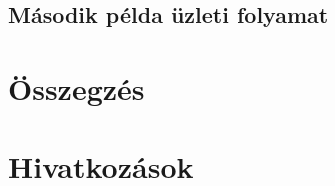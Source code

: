 \documentclass[12pt,a4paper]{book}
\begin{document}

\section{Második példa üzleti folyamat}


\chapter{Összegzés}


\chapter{Hivatkozások}

\end{document}

